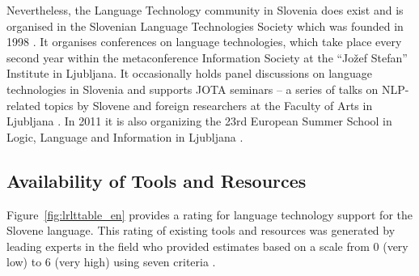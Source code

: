 \begin{multicols}{2}
Nevertheless, the Language Technology community in Slovenia does exist and is organised in the Slovenian Language Technologies Society which was founded in 1998 \cite{SDJT1}. It organises conferences on language technologies, which take place every second year within the metaconference Information Society at the “Jožef Stefan” Institute in Ljub\-ljana.  It occasionally holds panel discussions on language technologies in Slovenia and supports JOTA seminars – a series of talks on NLP-related topics by Slovene and foreign researchers at the Faculty of Arts in Ljub\-ljana \cite{Jota1}. In 2011 it is also organizing the 23rd European Summer School in Logic, Language and Information in Ljub\-ljana \cite{ESSLLI1}.  
  
\subsection{Availability of Tools and Resources}

Figure~\ref{fig:lrlttable_en} provides a rating for language technology support for the Slovene language. This rating of existing tools and resources was generated by leading experts in the field who provided estimates based on a scale from 0 (very low) to 6 (very high) using seven criteria \cite{expert1}.


\end{multicols}
